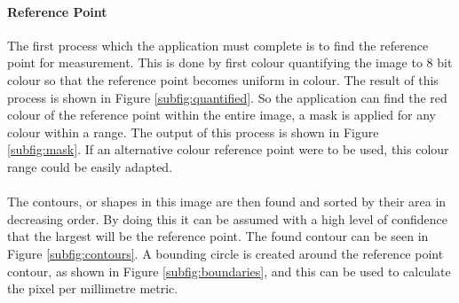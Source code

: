 			\paragraph{Reference Point}
				The first process which the application must complete is to find the reference point for measurement. This is done by first colour quantifying the image to 8 bit colour so that the reference point becomes uniform in colour. The result of this process is shown in Figure \ref{subfig:quantified}. So the application can find the red colour of the reference point within the entire image, a mask is applied for any colour within a range. The output of this process is shown in Figure \ref{subfig:mask}. If an alternative colour reference point were to be used, this colour range could be easily adapted.
				\\\\
				The contours, or shapes in this image are then found and sorted by their area in decreasing order. By doing this it can be assumed with a high level of confidence that the largest will be the reference point. The found contour can be seen in Figure \ref{subfig:contours}. A bounding circle is created around the reference point contour, as shown in Figure \ref{subfig:boundaries}, and this can be used to calculate the pixel per millimetre metric.
